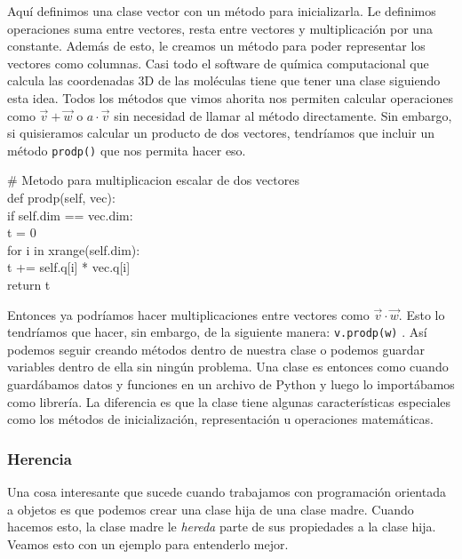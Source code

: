 \documentclass[10pt,letterpaper]{article}
\newcommand{\inlinecode}[1]{
\colorbox{light-gray}{\texttt{#1}}
}
\newenvironment{Code}
{
\begin{lrbox}{\selvestebox}%
\begin{minipage}{\dimexpr\columnwidth-2\fboxsep\relax}
\fontfamily{\ttdefault}\selectfont
}
{\end{minipage}\end{lrbox}%
\begin{center}
\colorbox{light-gray}{\usebox{\selvestebox}}
\end{center}
}
\begin{document}
Aqu\'i definimos una clase vector con un m\'etodo para inicializarla. Le definimos operaciones suma entre vectores, resta entre vectores y multiplicaci\'on por una constante. Adem\'as de esto, le creamos un m\'etodo para poder representar los vectores como columnas. Casi todo el software de qu\'imica computacional que calcula las coordenadas 3D de las mol\'eculas tiene que tener una clase siguiendo esta idea. Todos los m\'etodos que vimos ahorita nos permiten calcular operaciones como $\vec{v} + \vec{w}$ o $a \cdot \vec{v}$ sin necesidad de llamar al m\'etodo directamente. Sin embargo, si quisieramos calcular un producto de dos vectores, tendr\'iamos que incluir un m\'etodo \inlinecode{prodp()} que nos permita hacer eso.

\begin{footnotesize}
\begin{Code}
\# Metodo para multiplicacion escalar de dos vectores\\
def prodp(self, vec):\\
\hspace*{5mm} if self.dim == vec.dim:\\
\hspace*{11mm} t = 0\\
\hspace*{11mm} for i in xrange(self.dim):\\
\hspace*{17mm} t += self.q[i] * vec.q[i]\\
\hspace*{11mm} return t
\end{Code}
\end{footnotesize}

Entonces ya podr\'iamos hacer multiplicaciones entre vectores como $\vec{v} \cdot \vec{w}$. Esto lo tendr\'iamos que hacer, sin embargo, de la siguiente manera: \inlinecode{v.prodp(w)}. As\'i podemos seguir creando m\'etodos dentro de nuestra clase o podemos guardar variables dentro de ella sin ning\'un problema. Una clase es entonces como cuando guard\'abamos datos y funciones en un archivo de Python y luego lo import\'abamos como librer\'ia. La diferencia es que la clase tiene algunas caracter\'isticas especiales como los m\'etodos de inicializaci\'on, representaci\'on u operaciones matem\'aticas.

\subsubsection{Herencia}
Una cosa interesante que sucede cuando trabajamos con programaci\'on orientada a objetos es que podemos crear una clase hija de una clase madre. Cuando hacemos esto, la clase madre le \emph{hereda} parte de sus propiedades a la clase hija. Veamos esto con un ejemplo para entenderlo mejor.\\
\end{document}

